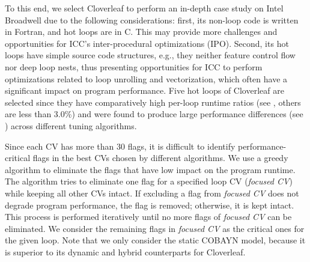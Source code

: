 To this end, we select Cloverleaf to perform an in-depth case study on
Intel Broadwell due to the following considerations: first, its
non-loop code is written in Fortran, and hot loops are in C.  This may
provide more challenges and opportunities for ICC's inter-procedural
optimizations (IPO).  Second, its hot loops have simple source code
structures, e.g., they neither feature control flow nor deep loop
nests, thus presenting opportunities for ICC to perform optimizations
related to loop unrolling and vectorization, which often have a
significant impact on program performance.
Five hot loops of Cloverleaf are selected since they have
comparatively high per-loop runtime ratios (see ,
others are less than 3.0\%) and were found to produce large
performance differences (see ) across different
tuning algorithms.

Since each CV has more than 30 flags, it is difficult to identify
performance-critical flags in the best CVs chosen by different algorithms.
We use a greedy
algorithm to eliminate the flags that have low impact on the
program runtime.  The algorithm tries to eliminate one
flag for a specified loop CV (\emph{focused CV}) while
keeping all other CVs intact.  If excluding a flag from \emph{focused
  CV} does not degrade program performance, the flag is removed;
otherwise, it is kept intact.  This process is performed iteratively until no more
flags of \emph{focused CV} can be eliminated.  We consider the remaining flags in
\emph{focused CV} as the critical ones for the given loop.
Note that we only consider the static COBAYN model, because it is
superior to its dynamic and hybrid counterparts for Cloverleaf.
%

